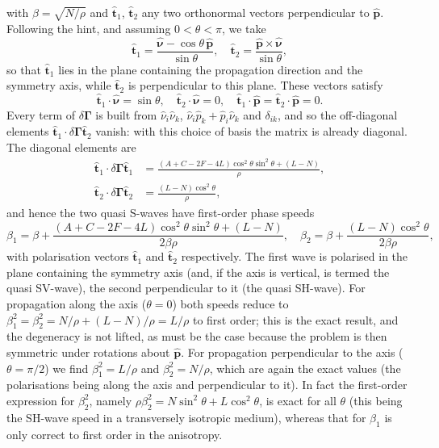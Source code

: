 \documentclass[a4paper,10pt]{paper}
\begin{document}
\begin{enumerate}
\begin{enumerate}
\begin{equation*}
\end{equation*}
with $\beta=\sqrt{N/\rho}$ and $\hat{\mathbf{t}}_{1}$, $\hat{\mathbf{t}}_{2}$ any two orthonormal vectors perpendicular to $\hat{\mathbf{p}}$. Following the hint, and assuming $0<\theta<\pi$, we take
\begin{equation*}
    \hat{\mathbf{t}}_{1}=\frac{\hat{\bm{\nu}}-\cos\theta\,\hat{\mathbf{p}}}{\sin\theta}, \quad \hat{\mathbf{t}}_{2}=\frac{\hat{\mathbf{p}}\times\hat{\bm{\nu}}}{\sin\theta},
\end{equation*}
so that $\hat{\mathbf{t}}_{1}$ lies in the plane containing the propagation direction and the symmetry axis, while $\hat{\mathbf{t}}_{2}$ is perpendicular to this plane. These vectors satisfy
\begin{equation*}
    \hat{\mathbf{t}}_{1}\cdot\hat{\bm{\nu}}=\sin\theta, \quad \hat{\mathbf{t}}_{2}\cdot\hat{\bm{\nu}}=0, \quad \hat{\mathbf{t}}_{1}\cdot\hat{\mathbf{p}}=\hat{\mathbf{t}}_{2}\cdot\hat{\mathbf{p}}=0.
\end{equation*}
Every term of $\delta\bm{\Gamma}$ is built from $\hat{\nu}_{i}\hat{\nu}_{k}$, $\hat{\nu}_{i}\hat{p}_{k}+\hat{p}_{i}\hat{\nu}_{k}$ and $\delta_{ik}$, and so the off-diagonal elements $\hat{\mathbf{t}}_{1}\cdot\delta\bm{\Gamma}\hat{\mathbf{t}}_{2}$ vanish: with this choice of basis the matrix is already diagonal. The diagonal elements are
\begin{align*}
    \hat{\mathbf{t}}_{1}\cdot\delta\bm{\Gamma}\hat{\mathbf{t}}_{1}&=\frac{(A+C-2F-4L)\cos^{2}\theta\sin^{2}\theta+(L-N)}{\rho}, \\
    \hat{\mathbf{t}}_{2}\cdot\delta\bm{\Gamma}\hat{\mathbf{t}}_{2}&=\frac{(L-N)\cos^{2}\theta}{\rho},
\end{align*}
and hence the two quasi S-waves have first-order phase speeds
\begin{equation*}
    \beta_{1}=\beta+\frac{(A+C-2F-4L)\cos^{2}\theta\sin^{2}\theta+(L-N)}{2\beta\rho}, \quad \beta_{2}=\beta+\frac{(L-N)\cos^{2}\theta}{2\beta\rho},
\end{equation*}
with polarisation vectors $\hat{\mathbf{t}}_{1}$ and $\hat{\mathbf{t}}_{2}$ respectively. The first wave is polarised in the plane containing the symmetry axis (and, if the axis is vertical, is termed the quasi SV-wave), the second perpendicular to it (the quasi SH-wave). For propagation along the axis ($\theta=0$) both speeds reduce to $\beta_{1}^{2}=\beta_{2}^{2}=N/\rho+(L-N)/\rho=L/\rho$ to first order; this is the exact result, and the degeneracy is not lifted, as must be the case because the problem is then symmetric under rotations about $\hat{\mathbf{p}}$. For propagation perpendicular to the axis ($\theta=\pi/2$) we find $\beta_{1}^{2}=L/\rho$ and $\beta_{2}^{2}=N/\rho$, which are again the exact values (the polarisations being along the axis and perpendicular to it). In fact the first-order expression for $\beta_{2}^{2}$, namely $\rho\beta_{2}^{2}=N\sin^{2}\theta+L\cos^{2}\theta$, is exact for all $\theta$ (this being the SH-wave speed in a transversely isotropic medium), whereas that for $\beta_{1}$ is only correct to first order in the anisotropy.
\end{enumerate}


\end{enumerate}
\end{document}
